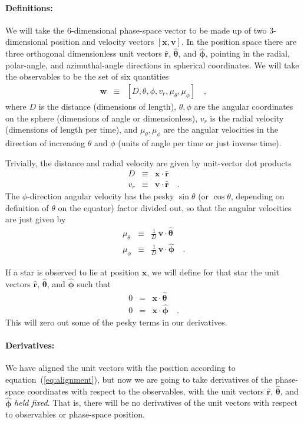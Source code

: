 \documentclass[12pt,letterpaper]{article}
\newcommand{\mvector}[1]{\boldsymbol{#1}}
\newcommand{\vv}{\mvector{v}}
\newcommand{\vx}{\mvector{x}}
\newcommand{\observable}{\mvector{w}}
\newcommand{\vhat}[1]{\mvector{\hat{#1}}}
\newcommand{\rhat}{\vhat{r}}
\newcommand{\thetahat}{\vhat{\theta}}
\newcommand{\phihat}{\vhat{\phi}}
\begin{document}
\paragraph{Definitions:}
We will take the 6-dimensional phase-space vector to be made up of two
3-dimensional position and velocity vectors $[\vx,\vv]$.  In the
position space there are three orthogonal dimensionless unit vectors
$\rhat$, $\thetahat$, and $\phihat$, pointing in the radial,
polar-angle, and azimuthal-angle directions in spherical coordinates.
We will take the observables to be the set of six quantities
\begin{eqnarray}\displaystyle
\observable &\equiv& [D,\theta,\phi,v_r,\mu_\theta,\mu_\phi]
\quad ,
\end{eqnarray}
where $D$ is the distance (dimensions of length), $\theta, \phi$ are
the angular coordinates on the sphere (dimensions of angle or
dimensionless), $v_r$ is the radial velocity (dimensions of length per
time), and $\mu_\theta, \mu_\phi$ are the angular velocities in the
direction of increasing $\theta$ and $\phi$ (units of angle per time
or just inverse time).

Trivially, the distance and radial velocity are given by unit-vector
dot products
\begin{eqnarray}\displaystyle
D &\equiv& \vx\cdot\rhat
\nonumber\\
v_r &\equiv& \vv\cdot\rhat
\quad .\label{eq:radials}
\end{eqnarray}
The $\phi$-direction angular velocity has the pesky $\sin\theta$ (or
$\cos\theta$, depending on definition of $\theta$ on the equator)
factor divided out, so that the angular velocities are just given by
\begin{eqnarray}\displaystyle
\mu_{\theta} &\equiv& \frac{1}{D}\,\vv\cdot\thetahat
\nonumber\\
\mu_{\phi} &\equiv& \frac{1}{D}\,\vv\cdot\phihat
\quad .\label{eq:pms}
\end{eqnarray}

If a star is observed to lie at position $\vx$, we will define for
that star the unit vectors $\rhat$, $\thetahat$, and $\phihat$ such
that
\begin{eqnarray}\displaystyle
0 &=& \vx\cdot\thetahat
\nonumber\\
0 &=& \vx\cdot\phihat
\quad .\label{eq:alignment}
\end{eqnarray}
This will zero out some of the pesky terms in our derivatives.

\paragraph{Derivatives:}
We have aligned the unit vectors with the position according to
equation~(\ref{eq:alignment}), but now we are going to take
derivatives of the phase-space coordinates with respect to the
observables, with the unit vectors $\rhat$, $\thetahat$, and $\phihat$
\emph{held fixed}.  That is, there will be no derivatives of the unit
vectors with respect to observables or phase-space position.
\end{document}
